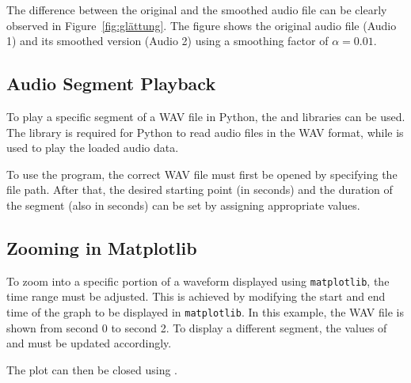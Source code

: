 The difference between the original and the smoothed audio file can be clearly observed in Figure~\ref{fig:glättung}.  
The figure shows the original audio file (Audio 1) and its smoothed version (Audio 2) using a smoothing factor of \( \alpha = 0.01 \).

\subsection{Audio Segment Playback}

To play a specific segment of a WAV file in Python, the  and  libraries can be used.  
The  library is required for Python to read audio files in the WAV format,  
while  is used to play the loaded audio data.

To use the program, the correct WAV file must first be opened by specifying the file path.  
After that, the desired starting point (in seconds) and the duration of the segment (also in seconds) can be set by assigning appropriate values.

\begin{code}[!htp]
	\caption{Program to extract, play, and save a specific time segment from a WAV audio file} 
	\label{Code:Python:File:playAndSaveAudioSegment}
\end{code}

\subsection{Zooming in Matplotlib}

To zoom into a specific portion of a waveform displayed using \texttt{matplotlib}, the time range must be adjusted.  
This is achieved by modifying the start and end time of the graph to be displayed in \texttt{matplotlib}.  
In this example, the WAV file is shown from second 0 to second 2.  
To display a different segment, the values of  and  must be updated accordingly.

\begin{code}[!htp]
	\caption{Program to visualize a specific segment of a WAV file as a waveform plot} 
	\label{Code:Python:File:visualizeAudioSegment}
\end{code}

The plot can then be closed using .

